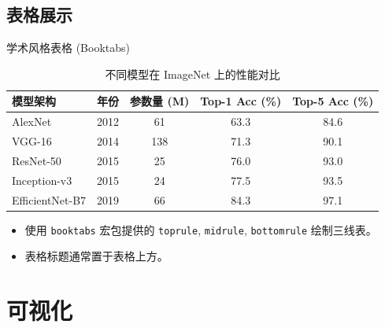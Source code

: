 \subsection{表格展示}
\begin{frame}{学术风格表格 (Booktabs)}
    \begin{table}
        \caption{不同模型在 ImageNet 上的性能对比}
        \centering
        \begin{tabularx}{\textwidth}{Xcccc}
            \toprule
            \textbf{模型架构} & \textbf{年份} & \textbf{参数量 (M)} & \textbf{Top-1 Acc (\%)} & \textbf{Top-5 Acc (\%)} \\
            \midrule
            AlexNet         & 2012 & 61    & 63.3 & 84.6 \\
            VGG-16          & 2014 & 138   & 71.3 & 90.1 \\
            ResNet-50       & 2015 & 25    & 76.0 & 93.0 \\
            Inception-v3    & 2015 & 24    & 77.5 & 93.5 \\
            EfficientNet-B7 & 2019 & 66    & 84.3 & 97.1 \\
            \bottomrule
        \end{tabularx}
    \end{table}
    \vspace{0.5em}
    \begin{itemize}
        \item 使用 \texttt{booktabs} 宏包提供的 \texttt{toprule}, \texttt{midrule}, \texttt{bottomrule} 绘制三线表。
        \item 表格标题通常置于表格上方。
    \end{itemize}
\end{frame}


\section{可视化}

